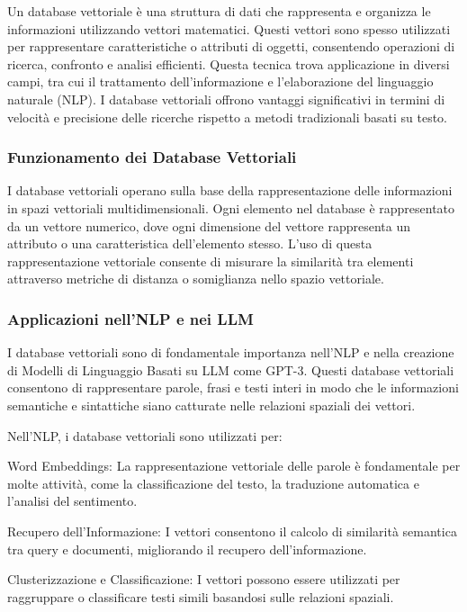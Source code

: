 Un database vettoriale è una struttura di dati che rappresenta e organizza le informazioni utilizzando vettori matematici. Questi vettori sono spesso utilizzati per rappresentare caratteristiche o attributi di oggetti, consentendo operazioni di ricerca, confronto e analisi efficienti. Questa tecnica trova applicazione in diversi campi, tra cui il trattamento dell'informazione e l'elaborazione del linguaggio naturale (NLP). I database vettoriali offrono vantaggi significativi in termini di velocità e precisione delle ricerche rispetto a metodi tradizionali basati su testo.

\subsubsection{Funzionamento dei Database Vettoriali}

I database vettoriali operano sulla base della rappresentazione delle informazioni in spazi vettoriali multidimensionali. Ogni elemento nel database è rappresentato da un vettore numerico, dove ogni dimensione del vettore rappresenta un attributo o una caratteristica dell'elemento stesso. L'uso di questa rappresentazione vettoriale consente di misurare la similarità tra elementi attraverso metriche di distanza o somiglianza nello spazio vettoriale.

\subsubsection{Applicazioni nell'NLP e nei LLM}

I database vettoriali sono di fondamentale importanza nell'NLP e nella creazione di Modelli di Linguaggio Basati su LLM come GPT-3. Questi database vettoriali consentono di rappresentare parole, frasi e testi interi in modo che le informazioni semantiche e sintattiche siano catturate nelle relazioni spaziali dei vettori.

Nell'NLP, i database vettoriali sono utilizzati per:

Word Embeddings: La rappresentazione vettoriale delle parole è fondamentale per molte attività, come la classificazione del testo, la traduzione automatica e l'analisi del sentimento.

Recupero dell'Informazione: I vettori consentono il calcolo di similarità semantica tra query e documenti, migliorando il recupero dell'informazione.

Clusterizzazione e Classificazione: I vettori possono essere utilizzati per raggruppare o classificare testi simili basandosi sulle relazioni spaziali.

